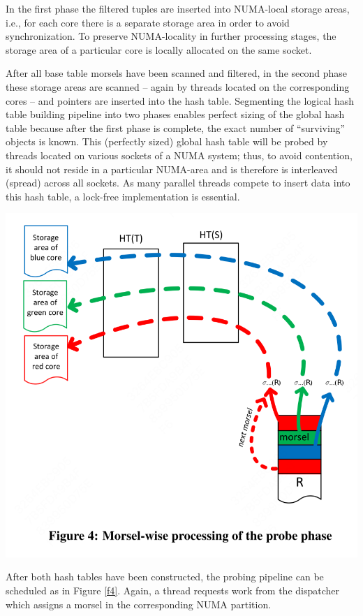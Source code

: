 \documentclass[11pt]{article}
\begin{document}
In the first phase the filtered tuples are inserted into NUMA-local storage areas, i.e., for each core
there is a separate storage area in order to avoid synchronization. To preserve NUMA-locality in
further processing stages, the storage area of a particular core is locally allocated on the same
socket.

After all base table morsels have been scanned and filtered, in the second phase these storage areas
are scanned – again by threads located on the corresponding cores – and pointers are inserted into the
hash table. Segmenting the logical hash table building pipeline into two phases enables perfect sizing
of the global hash table because after the first phase is complete, the exact number of “surviving”
objects is known. This (perfectly sized) global hash table will  be probed by threads located on
various sockets of a NUMA system; thus, to avoid contention, it should not reside in a particular
NUMA-area and is therefore is interleaved (spread) across all sockets. As many parallel threads
compete to insert data into this hash table, a lock-free implementation is essential.

\begin{center}
\includegraphics[width=.7\textwidth]{../../images/papers/66.png}
\label{f4}
\end{center}

After both hash tables have been constructed, the probing pipeline can be scheduled as in Figure
\ref{f4}. Again, a thread requests work from the dispatcher which assigns a morsel in the corresponding
NUMA partition.
\end{document}
